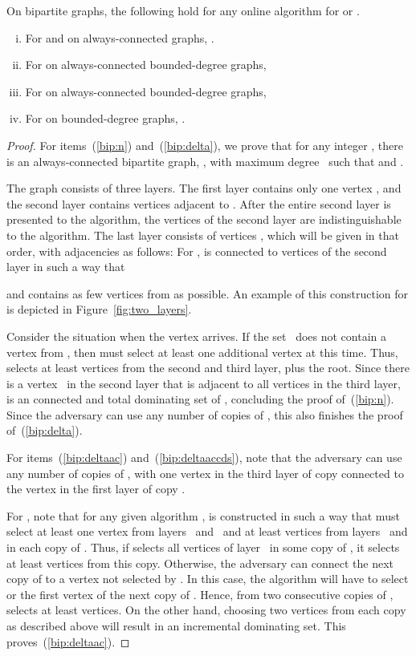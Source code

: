 \begin{proposition}
\label{prop:bip-2layers}
On bipartite graphs, the following hold for any online algorithm \A
for \ds or \cds.
\begin{enumerate}[(i)]
\item \label{bip:n}
 For \ds and \cds on always-connected graphs, .
\item \label{bip:deltaac}
 For \ds on always-connected bounded-degree graphs, 
\item \label{bip:deltaaccds}
 For \cds on always-connected bounded-degree graphs,  
\item \label{bip:delta}
 For \cds on bounded-degree graphs, .
\end{enumerate}
\end{proposition}
\begin{proof}
For items~(\ref{bip:n}) and~(\ref{bip:delta}), we prove that
for any integer , 
there is an always-connected bipartite graph, , with maximum degree~
such that  and
.

The graph  consists of three layers.
The first layer contains only one vertex , and
the second layer contains  vertices  adjacent to .
After the entire second layer is presented to
the algorithm, the vertices of the second layer are indistinguishable
to the algorithm.
The last layer consists of  vertices ,
which will be given in that order,
with adjacencies as follows: For
,  is
connected to  vertices of the second layer in such a way
that 

and  contains as few vertices
from  as
possible.
An example of this construction for  is depicted in
Figure~\ref{fig:two_layers}.

Consider the situation when the vertex  arrives.
If the set~ does not contain a vertex
from , then \A must select
at least one additional vertex at this time.
Thus, \A{} selects at least  vertices
from the second and third layer, plus the root.
Since there is a vertex~ in the second layer that is adjacent to all
vertices in the third layer,  is an \incr connected and total 
dominating set of , concluding the proof of~(\ref{bip:n}).
Since the adversary can use any number of copies of , this also
finishes the proof of~(\ref{bip:delta}).

For items~(\ref{bip:deltaac}) and~(\ref{bip:deltaaccds}),
note that the adversary can
use any number of copies of , with one vertex in the third layer of
copy  connected to the vertex in the first layer of copy .

For \ds, note that for any given algorithm ,  is constructed in such 
a way that  must select at least
one vertex from layers~ and~ and at least  vertices from
layers~ and  in each copy of .
Thus, if \A selects all  vertices of layer~ in some copy
of , it selects at least  vertices from this copy.
Otherwise, the adversary can connect the next copy of  to a vertex 
not selected by \A.
In this case, the algorithm will have to select  or the first
vertex of the next copy of . 
Hence, from two consecutive copies of , \A selects at least
 vertices.
On the other hand, choosing two vertices from each copy as described above will
result in an incremental dominating set. 
This proves~(\ref{bip:deltaac}).


\end{proof}
